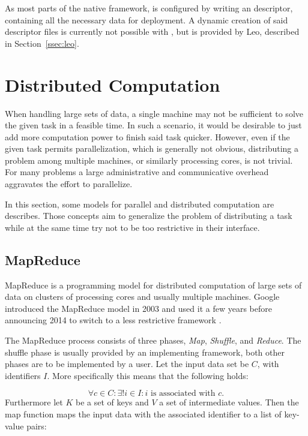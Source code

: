 As most parts of the native \uima{} framework, \uimaas{} is configured by writing an \xml{} descriptor, containing all the necessary data for deployment. A dynamic creation of said descriptor files is currently not possible with \uimafit{}, but is provided by Leo, described in Section~\ref{ssec:leo}.

\section{Distributed Computation}
When handling large sets of data, a single machine may not be sufficient to solve the given task in a feasible time. In such a scenario, it would be desirable to just add more computation power to finish said task quicker. However, even if the given task permits parallelization, which is generally not obvious, distributing a problem among multiple machines, or similarly processing cores, is not trivial. For many problems a large administrative and communicative overhead aggravates the effort to parallelize.

In this section, some models for parallel and distributed computation are describes. Those concepts aim to generalize the problem of distributing a task while at the same time try not to be too restrictive in their interface. 

\subsection{MapReduce}
MapReduce is a programming model for distributed computation of large sets of data on clusters of processing cores and usually multiple machines. Google introduced the MapReduce model in 2003 and used it a few years before announcing 2014 to switch to a less restrictive framework \cite{dean2008mapreduce}.

The MapReduce process consists of three phases, \emph{Map}, \emph{Shuffle}, and \emph{Reduce}. The shuffle phase is usually provided by an implementing framework, both other phases are to be implemented by a user. Let the input data set be $C$, with identifiers $I$. More specifically this means that the following holds:

\[\forall{}c\in{}C:\exists!{}i\in{}I:i\text{ is associated with }c.\]
Furthermore let $K$ be a set of keys and $V$ a set of intermediate values. Then the map function maps the input data with the associated identifier to a list of key-value pairs:


